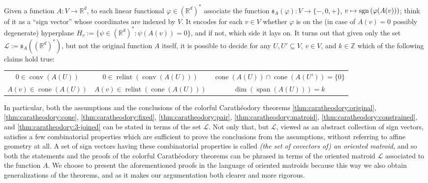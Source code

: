 \documentclass[a4paper,11pt,reqno, english]{amsart}
\theoremstyle{definition}
\theoremstyle{remark}
\newcommand\R{\mathbb R}
\newcommand\Z{\mathbb Z}
\newcommand\sgn{{\rm sgn\,}}
\DeclareMathOperator{\cone}{\mathrm{cone}}
\DeclareMathOperator{\relint}{\mathrm{relint}}
\DeclareMathOperator{\conv}{\mathrm{conv}}
\begin{document}
Given a function $A\colon V\to\R^d$, to each linear functional $\varphi\in(\R^d)^*$ associate the function $\mathfrak{s}_A(\varphi)\colon V\to\{-,0,+\}$, $v\mapsto \sgn(\varphi(A(v)))$; think of it as a ``sign vector'' whose coordinates are indexed by $V$. It encodes for each $v\in V$ whether $\varphi$ is on the (in case of $A(v)=0$ possibly degenerate) hyperplane $H_v:=\{\psi\in(\R^d)^*: \psi(A(v))=0\}$, and if not, which side it lays on. It turns out that given only the set $\mathscr{L}:=\mathfrak{s}_A((\R^d)^*)$, but not the original function $A$ itself, it is possible to decide for any $U,U'\subseteq V$, $v\in V$, and $k\in\Z$ which of the following claims hold true:
\begin{center}
    \begin{tabular}{ccc}
        $0\in\conv(A(U))$ & $0\in\relint(\conv(A(U)))$ & $\cone(A(U))\cap\cone(A(U'))=\{0\}$ \\
        $A(v)\in\cone(A(U))$ & $A(v)\in\relint(\cone(A(U)))$ & $\dim(\operatorname{span}(A(U)))=k$
    \end{tabular}
\end{center}
In particular, both the assumptions and the conclusions of the colorful Carath\'eodory theorems \ref{thm:caratheodory:original}, \ref{thm:caratheodory:cone}, \ref{thm:caratheodory:fixed}, \ref{thm:caratheodory:pair}, \ref{thm:caratheodory:matroid}, \ref{thm:caratheodory:constrained}, and \ref{thm:caratheodory:3-joined} can be stated in terms of the set $\mathscr{L}$. Not only that, but $\mathscr{L}$, viewed as an abstract collection of sign vectors, satisfies a few combinatorial properties which are sufficient to prove the conclusions from the assumptions, without referring to affine geometry at all. A set of sign vectors having these combinatorial properties is called \emph{(the set of covectors of) an oriented matroid}, and so both the statements and the proofs of the colorful Carath\'eodory theorems can be phrased in terms of the oriented matroid $\mathscr{L}$ associated to the function $A$. We choose to present the aforementioned proofs in the language of oriented matroids because this way we also obtain generalizations of the theorems, and as it makes our argumentation both clearer and more rigorous.
\end{document}
